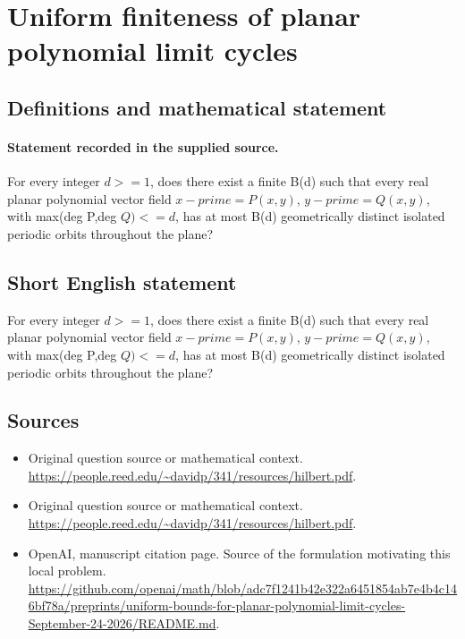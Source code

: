\documentclass[11pt]{article}
\begin{document}
\section*{Uniform finiteness of planar polynomial limit cycles}\label{30007174}
\subsection{Definitions and mathematical statement}
\paragraph{Statement recorded in the supplied source.}
For every integer $d>=1$, does there exist a finite B(d) such that every real planar polynomial vector field $x-prime=P(x,y)$, $y-prime=Q(x,y)$, with max(deg P,deg $Q)<=d$, has at most B(d) geometrically distinct isolated periodic orbits throughout the plane?
\subsection{Short English statement}
For every integer $d>=1$, does there exist a finite B(d) such that every real planar polynomial vector field $x-prime=P(x,y)$, $y-prime=Q(x,y)$, with max(deg P,deg $Q)<=d$, has at most B(d) geometrically distinct isolated periodic orbits throughout the plane?
\subsection{Sources}
\begin{itemize}
\item[S1] Original question source or mathematical context.
\url{https://people.reed.edu/~davidp/341/resources/hilbert.pdf}.
\item[S2] Original question source or mathematical context.
\url{https://people.reed.edu/~davidp/341/resources/hilbert.pdf}.
\item[S3] OpenAI, manuscript citation page. Source of the formulation motivating this local problem.
\url{https://github.com/openai/math/blob/adc7f1241b42e322a6451854ab7e4b4c146bf78a/preprints/uniform-bounds-for-planar-polynomial-limit-cycles-September-24-2026/README.md}.
\end{itemize}
\end{document}
